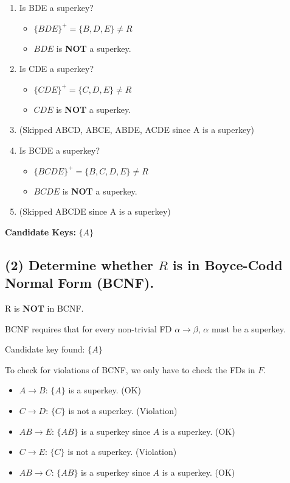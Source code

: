 \documentclass{article}[a4paper,11pt]
\begin{document}
\begin{enumerate}
\begin{itemize}
    \end{itemize}
    \item Is BDE a superkey?
    \begin{itemize}
        \item $\{BDE\}^+ = \{B,D,E\} \neq R$
        \item $BDE$ is \textbf{NOT} a superkey.
    \end{itemize}
    \item Is CDE a superkey?
    \begin{itemize}
        \item $\{CDE\}^+ = \{C,D,E\} \neq R$
        \item $CDE$ is \textbf{NOT} a superkey.
    \end{itemize}
    \item (Skipped ABCD, ABCE, ABDE, ACDE since A is a superkey)
    \item Is BCDE a superkey?
    \begin{itemize}
        \item $\{BCDE\}^+ = \{B,C,D,E\} \neq R$
        \item $BCDE$ is \textbf{NOT} a superkey.
    \end{itemize}
    \item (Skipped ABCDE since A is a superkey)
\end{enumerate}

\vspace{1em}
\noindent 
\textbf{Candidate Keys:} $\{ A \}$

\vspace{2em} 

\subsection*{(2) Determine whether $R$ is in Boyce-Codd Normal Form (BCNF).}

R is \textbf{NOT} in BCNF.

\vspace{1em}

BCNF requires that for every non-trivial FD $\alpha \rightarrow \beta$, $\alpha$ must be a superkey.

Candidate key found: $\{ A \}$

To check for violations of BCNF, we only have to check the FDs in $F$.

\begin{itemize}
    \item $A \rightarrow B$: $\{ A \}$ is a superkey. (OK)
    \item $C \rightarrow D$: $\{ C \}$ is not a superkey. (Violation)
    \item $AB \rightarrow E$: $\{ AB \}$ is a superkey since $A$ is a superkey. (OK)
    \item $C \rightarrow E$: $\{ C \}$ is not a superkey. (Violation)
    \item $AB \rightarrow C$: $\{ AB \}$ is a superkey since $A$ is a superkey. (OK)
\end{itemize}
\end{document}
